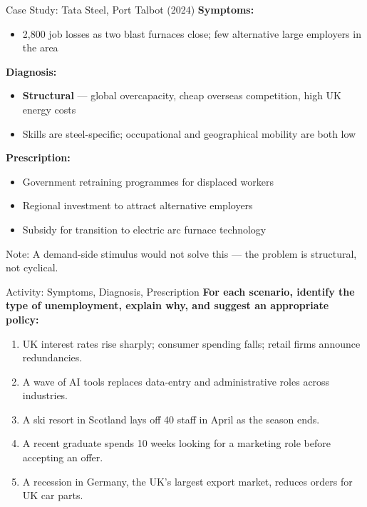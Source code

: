 \documentclass[16pt,aspectratio=169]{beamer}
\begin{document}
\begin{frame}{Case Study: Tata Steel, Port Talbot (2024)}
    \textbf{Symptoms:}
    \begin{itemize}
        \item 2,800 job losses as two blast furnaces close; few alternative large employers in the area
    \end{itemize}

    \vspace{0.2em}
    \textbf{Diagnosis:}
    \begin{itemize}
        \item \textbf{Structural} --- global overcapacity, cheap overseas competition, high UK energy costs
        \item Skills are steel-specific; occupational and geographical mobility are both low
    \end{itemize}

    \vspace{0.2em}
    \textbf{Prescription:}
    \begin{itemize}
        \item Government retraining programmes for displaced workers
        \item Regional investment to attract alternative employers
        \item Subsidy for transition to electric arc furnace technology
    \end{itemize}

    \vspace{0.2em}
    \alert{Note:} A demand-side stimulus would not solve this --- the problem is structural, not cyclical.
\end{frame}

\begin{frame}{Activity: Symptoms, Diagnosis, Prescription}
    \textbf{For each scenario, identify the type of unemployment, explain why, and suggest an appropriate policy:}

    \begin{enumerate}\setlength\itemsep{0.4em}
        \item UK interest rates rise sharply; consumer spending falls; retail firms announce redundancies.
        \item A wave of AI tools replaces data-entry and administrative roles across industries.
        \item A ski resort in Scotland lays off 40 staff in April as the season ends.
        \item A recent graduate spends 10 weeks looking for a marketing role before accepting an offer.
        \item A recession in Germany, the UK's largest export market, reduces orders for UK car parts.
    \end{enumerate}
\end{frame}
\end{document}
